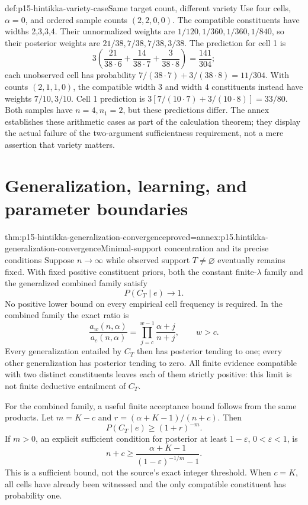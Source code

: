 \begin{hbexample}{def:p15-hintikka-variety-case}{Same target count, different variety}
Use four cells, \(\alpha=0\), and ordered sample counts
\((2,2,0,0)\). The compatible constituents have widths 2,3,3,4.
Their unnormalized weights are \(1/120,1/360,1/360,1/840\),
so their posterior weights are \(21/38,7/38,7/38,3/38\).
The prediction for cell 1 is
\[
 3\left(\frac{21}{38\cdot6}
       +\frac{14}{38\cdot7}+\frac3{38\cdot8}\right)
 =\frac{141}{304};
\]
each unobserved cell has probability
\(7/(38\cdot7)+3/(38\cdot8)=11/304\).
With counts \((2,1,1,0)\), the compatible width 3 and width 4
constituents instead have weights \(7/10,3/10\). Cell 1 prediction
is \(3[7/(10\cdot7)+3/(10\cdot8)]=33/80\).
Both samples have \(n=4,n_1=2\), but these predictions differ.
The annex establishes these arithmetic cases as part of the calculation
theorem; they display the actual failure of the two-argument
sufficientness requirement, not a mere assertion that variety matters.
\end{hbexample}

\section{Generalization, learning, and parameter boundaries}
\label{sec:p15-hintikka-generalization}

\begin{hbtheorem}{thm:p15-hintikka-generalization-convergence}{proved=annex:p15.hintikka-generalization-convergence}{Minimal-support concentration and its precise conditions}
Suppose \(n\to\infty\) while observed support \(T\ne\varnothing\)
eventually remains fixed. With fixed positive constituent priors, both
the constant finite-\(\lambda\) family and the generalized combined
family satisfy
\[
 P(C_T\mid e)\longrightarrow1.
\]
No positive lower bound on every empirical cell frequency is required.
In the combined family the exact ratio is
\[
 \frac{a_w(n,\alpha)}{a_c(n,\alpha)}
   =\prod_{j=c}^{w-1}\frac{\alpha+j}{n+j},\qquad w>c.
\]
Every generalization entailed by \(C_T\) then has posterior tending
to one; every other generalization has posterior tending to zero.
All finite evidence compatible with two distinct constituents leaves
each of them strictly positive: this limit is not finite deductive
entailment of \(C_T\).
\end{hbtheorem}

For the combined family, a useful finite acceptance bound follows from
the same products. Let \(m=K-c\) and
\(r=(\alpha+K-1)/(n+c)\). Then
\[
 P(C_T\mid e)\geq(1+r)^{-m}.
\]
If \(m>0\), an explicit sufficient condition for posterior at least
\(1-\varepsilon\), \(0<\varepsilon<1\), is
\[
 n+c\geq\frac{\alpha+K-1}
                  {(1-\varepsilon)^{-1/m}-1}.
\]
This is a sufficient bound, not the source's exact integer threshold.
When \(c=K\), all cells have already been witnessed and the only
compatible constituent has probability one.

